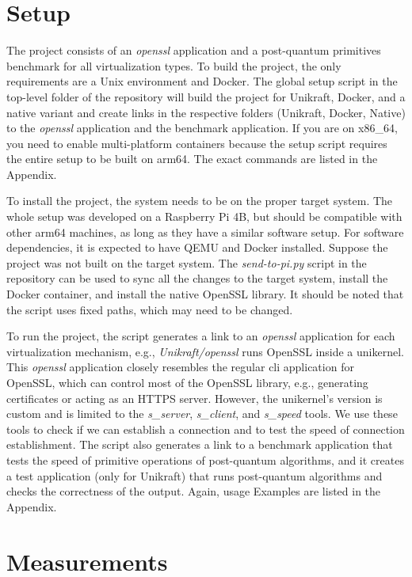 \documentclass[public,noindent]{aisecreport}
\begin{document}
\section{Setup}
The project consists of an \textit{openssl} application and a post-quantum primitives benchmark for all virtualization types. To build the project, the only requirements are a Unix environment and Docker. The global setup script in the top-level folder of the repository will build the project for Unikraft, Docker, and a native variant and create links in the respective folders (Unikraft, Docker, Native) to the \textit{openssl} application and the benchmark application. If you are on x86\_64, you need to enable multi-platform containers because the setup script requires the entire setup to be built on arm64. The exact commands are listed in the Appendix. 

To install the project, the system needs to be on the proper target system. The whole setup was developed on a Raspberry Pi 4B, but should be compatible with other arm64 machines, as long as they have a similar software setup. For software dependencies, it is expected to have QEMU and Docker installed. Suppose the project was not built on the target system. The \textit{send-to-pi.py} script in the repository can be used to sync all the changes to the target system, install the Docker container, and install the native OpenSSL library. It should be noted that the script uses fixed paths, which may need to be changed. 

To run the project, the script generates a link to an \textit{openssl} application for each virtualization mechanism, e.g., \textit{Unikraft/openssl} runs OpenSSL inside a unikernel. This \textit{openssl} application closely resembles the regular cli application for OpenSSL, which can control most of the OpenSSL library, e.g., generating certificates or acting as an HTTPS server. However, the unikernel's version is custom and is limited to the \textit{s\_server}, \textit{s\_client}, and \textit{s\_speed} tools. We use these tools to check if we can establish a connection and to test the speed of connection establishment. The script also generates a link to a benchmark application that tests the speed of primitive operations of post-quantum algorithms, and it creates a test application (only for Unikraft) that runs post-quantum algorithms and checks the correctness of the output. Again, usage Examples are listed in the Appendix.

\section{Measurements}
\end{document}
